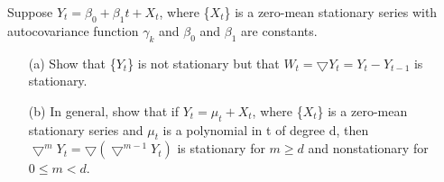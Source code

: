 \begin{ex}\label{ex:example_ts}
Suppose $Y_t=\beta_0+\beta_1 t+X_t$, where \{$X_t$\} is a zero-mean stationary series with autocovariance function $\gamma_k$ and $\beta_0$ and $\beta_1$ are constants.
  \begin{itemize}
  \item[(a)] Show that \{$Y_t$\} is not stationary but that $W_t= \bigtriangledown Y_t=Y_t-Y_{t-1}$ is stationary.
  \item[(b)] In general, show that if $Y_t=\mu_t+X_t$, where \{$X_t$\} is a zero-mean stationary series and $\mu_t$ is a polynomial in t of degree d, then $\bigtriangledown^{m} Y_t= \bigtriangledown ( \bigtriangledown^{m-1} Y_t)$ is stationary for $m \geq d$ and nonstationary for $0 \leq m < d$.
  \end{itemize}
\end{ex}


